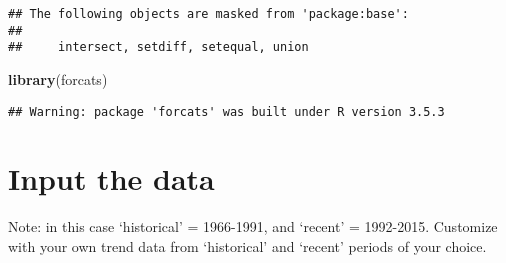 \documentclass[]{article}
\newenvironment{Shaded}{\begin{snugshade}}{\end{snugshade}}
\newcommand{\KeywordTok}[1]{\textcolor[rgb]{0.13,0.29,0.53}{\textbf{#1}}}
\newcommand{\NormalTok}[1]{#1}
\begin{document}
\begin{verbatim}
## The following objects are masked from 'package:base':
## 
##     intersect, setdiff, setequal, union
\end{verbatim}

\begin{Shaded}
\begin{Highlighting}[]
\KeywordTok{library}\NormalTok{(forcats)}
\end{Highlighting}
\end{Shaded}

\begin{verbatim}
## Warning: package 'forcats' was built under R version 3.5.3
\end{verbatim}

\section{Input the data}\label{input-the-data}

Note: in this case `historical' = 1966-1991, and `recent' = 1992-2015.
Customize with your own trend data from `historical' and `recent'
periods of your choice.
\end{document}
